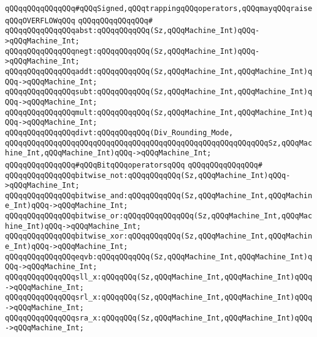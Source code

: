 \newline
\verb|qQQqqQQqqQQqqQQq#qQQqSigned,qQQqtrappingqQQqoperators,qQQqmayqQQqraiseqQQqOVERFLOWqQQq|\newline
\verb|qQQqqQQqqQQqqQQq#|\newline
\verb|qQQqqQQqqQQqqQQqabst:qQQqqQQqqQQq(Sz,qQQqMachine_Int)qQQq->qQQqMachine_Int;|\newline
\verb|qQQqqQQqqQQqqQQqnegt:qQQqqQQqqQQq(Sz,qQQqMachine_Int)qQQq->qQQqMachine_Int;|\newline
\verb|qQQqqQQqqQQqqQQqaddt:qQQqqQQqqQQq(Sz,qQQqMachine_Int,qQQqMachine_Int)qQQq->qQQqMachine_Int;|\newline
\verb|qQQqqQQqqQQqqQQqsubt:qQQqqQQqqQQq(Sz,qQQqMachine_Int,qQQqMachine_Int)qQQq->qQQqMachine_Int;|\newline
\verb|qQQqqQQqqQQqqQQqmult:qQQqqQQqqQQq(Sz,qQQqMachine_Int,qQQqMachine_Int)qQQq->qQQqMachine_Int;|\newline
\verb|qQQqqQQqqQQqqQQqdivt:qQQqqQQqqQQq(Div_Rounding_Mode,|\newline
\verb|qQQqqQQqqQQqqQQqqQQqqQQqqQQqqQQqqQQqqQQqqQQqqQQqqQQqqQQqqQQqSz,qQQqMachine_Int,qQQqMachine_Int)qQQq->qQQqMachine_Int;|\newline
\newline
\verb|qQQqqQQqqQQqqQQq#qQQqBitqQQqoperatorsqQQq|\newline
\verb|qQQqqQQqqQQqqQQq#|\newline
\verb|qQQqqQQqqQQqqQQqbitwise_not:qQQqqQQqqQQq(Sz,qQQqMachine_Int)qQQq->qQQqMachine_Int;|\newline
\verb|qQQqqQQqqQQqqQQqbitwise_and:qQQqqQQqqQQq(Sz,qQQqMachine_Int,qQQqMachine_Int)qQQq->qQQqMachine_Int;|\newline
\verb|qQQqqQQqqQQqqQQqbitwise_or:qQQqqQQqqQQqqQQq(Sz,qQQqMachine_Int,qQQqMachine_Int)qQQq->qQQqMachine_Int;|\newline
\verb|qQQqqQQqqQQqqQQqbitwise_xor:qQQqqQQqqQQq(Sz,qQQqMachine_Int,qQQqMachine_Int)qQQq->qQQqMachine_Int;|\newline
\verb|qQQqqQQqqQQqqQQqeqvb:qQQqqQQqqQQq(Sz,qQQqMachine_Int,qQQqMachine_Int)qQQq->qQQqMachine_Int;|\newline
\verb|qQQqqQQqqQQqqQQqsll_x:qQQqqQQq(Sz,qQQqMachine_Int,qQQqMachine_Int)qQQq->qQQqMachine_Int;|\newline
\verb|qQQqqQQqqQQqqQQqsrl_x:qQQqqQQq(Sz,qQQqMachine_Int,qQQqMachine_Int)qQQq->qQQqMachine_Int;|\newline
\verb|qQQqqQQqqQQqqQQqsra_x:qQQqqQQq(Sz,qQQqMachine_Int,qQQqMachine_Int)qQQq->qQQqMachine_Int;|\newline
